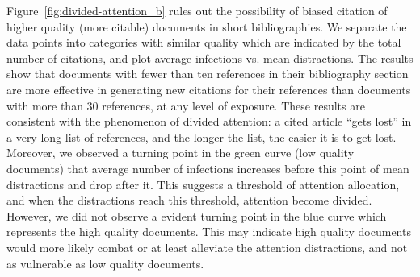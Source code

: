 \documentclass[10pt]{bmc_article}
\newcommand{\remove}[1]{}
\newenvironment{bmcformat}{\baselineskip20pt\sloppy\setboolean{publ}{false}}{\baselineskip20pt\sloppy}
\begin{document}
\begin{bmcformat}
Figure~\ref{fig:divided-attention_b} rules out the possibility of biased citation of higher quality (more citable) documents in short bibliographies. We separate the data points into categories with similar quality which are indicated by the total number of citations, and plot average infections vs. mean distractions.
The results show that documents with fewer than ten references in their bibliography section are more effective in generating new citations for their references than documents with more than 30 references, at any level of exposure.
These results are consistent with the phenomenon of divided attention: a cited article ``gets lost'' in a very long list of references, and the longer the list, the easier it is to get lost. Moreover, we observed a turning point in the green curve (low quality documents) that average number of infections increases before this point of mean distractions and drop after it. This suggests a threshold of attention allocation, and when the distractions reach this threshold, attention become divided. However, we did not observe a evident turning point in the blue curve which represents the high quality documents. This may indicate high quality documents would more likely combat or at least alleviate the attention distractions, and not as vulnerable as low quality documents.


\begin{comment}
Interestingly, review documents, which typically have hundreds of references, are not very effective at generating new citations to the cited articles. We believe that several principles are at work here. First, the divided attention dilutes the probability of a reader following the citation, now one of hundreds. Also, because a review article is supposed to be more comprehensive, it replaces original sources. Also, by the time of the review, the original articles are less novel\remove{and therefore, less interesting}.
\end{comment}





\end{bmcformat}
\end{document}
